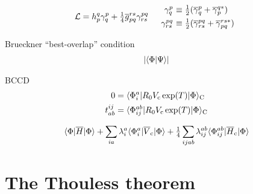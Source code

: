 \documentclass[11pt]{article}
\numberwithin{equation}{section}
\begin{document}
\begin{align}
  \mc{L}
=
  h_p^q
  \g^p_q
+
  \tfr{1}{4}
  \ol{g}_{pq}^{rs}
  \g^{pq}_{rs}
&&
\begin{array}{r@{\ }l}
  \g^p_q
&\equiv
  \tfr{1}{2}
  (
    \ol{\g}^p_q
  +
    \ol{\g}^{q*}_p
  )
\\[4pt]
  \g^{pq}_{rs}
&\equiv
  \tfr{1}{2}
  (
    \ol{\g}^{pq}_{rs}
  +
    \ol{\g}^{rs*}_{pq}
  )
\end{array}
\end{align}






\newpage


Brueckner ``best-overlap'' condition
\begin{align}
  |\langle\Phi |\Psi \rangle|
\end{align}


BCCD
\begin{align}
  0
&=
  \langle\Phi _i^a|
    R_0
    V_{\mathrm{c}}\,
    \mathrm{exp}(T)
  |\Phi \rangle_{\mathrm{C}}
\\
  t_{ab}^{ij}
&=
  \langle\Phi _{ij}^{ab}|
    R_0
    V_{\mathrm{c}}\,
    \mathrm{exp}(T)
  |\Phi \rangle_{\mathrm{C}}
\end{align}

\begin{align}
  \langle\Phi |\overline{H}|\Phi \rangle
+
  \sum_{ia}
  \lambda _i^a
  \langle\Phi _i^a|\overline{V}_{\mathrm{c}}|\Phi \rangle
+
  \tfrac{1}{4}
  \sum_{ijab}
  \lambda _{ij}^{ab}
  \langle\Phi _{ij}^{ab}|\overline{H}_{\mathrm{c}}|\Phi \rangle
\end{align}






\newpage
\appendix
\section{The Thouless theorem}
\label{appendix:thouless}
\end{document}
